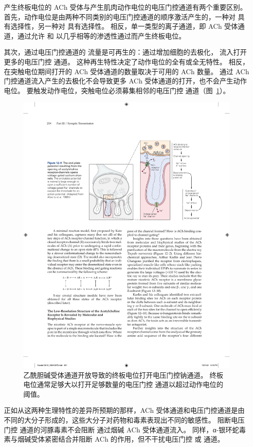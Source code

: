产生终板电位的 ACh 受体与产生肌肉动作电位的电压门控通道有两个重要区别。
首先，动作电位是由两种不同类别的电压门控通道的顺序激活产生的，一种对  具有选择性，另一种对  具有选择性。
相反，单一类型的离子通道，即 ACh 受体通道，通过允许  和  以几乎相等的渗透性通过而产生终板电位。


其次，通过电压门控通道的  流量是可再生的：通过增加细胞的去极化， 流入打开更多的电压门控  通道。
这种再生特性决定了动作电位的全有或全无特性。
相反，在突触电位期间打开的 ACh 受体通道的数量取决于可用的 ACh 数量。
 通过 ACh 门控通道流入产生的去极化不会导致更多 ACh 受体通道的打开，也不会产生动作电位。
要触发动作电位，突触电位必须募集相邻的电压门控  通道（图~\ref{fig:12_9}）。


\begin{figure}[htbp]
	\centering
	\includegraphics[width=0.7\linewidth]{chap12/fig_12_9}
	\caption{乙酰胆碱受体通道开放导致的终板电位打开电压门控钠通道。
		终板电位通常足够大以打开足够数量的电压门控  通道以超过动作电位的阈值\cite{alberts2017molecular}。}
	\label{fig:12_9}
\end{figure}


正如从这两种生理特性的差异所预期的那样，ACh 受体通道和电压门控通道是由不同的大分子形成的，这些大分子对药物和毒素表现出不同的敏感性。
阻断电压门控  通道的河豚毒素不会阻断  通过烟碱 ACh 受体通道流入。
同样，α-银环蛇毒素与烟碱受体紧密结合并阻断 ACh 的作用，但不干扰电压门控  或  通道。



